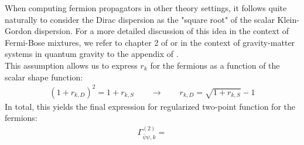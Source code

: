 When computing fermion propagators in other theory settings, it follows quite naturally to consider the Dirac dispersion as the "square root" of the scalar Klein-Gordon dispersion. For a more detailed discussion of this idea in the context of Fermi-Bose mixtures, we refer to chapter 2 of \cite{PawlowskiNPgaugeLecture} or in the context of gravity-matter systems in quantum gravity to the appendix of \cite{BritoHamadaPereiraYamada2019}. \\
This assumption allows us to express $r_k$ for the fermions as a function of the scalar shape function:
\begin{align}
\left(1+r_{k,D}\right)^2 = 1+r_{k,S} \qquad \longrightarrow \qquad r_{k, D} = \sqrt{1+r_{k,S}} - 1
\end{align}
In total, this yields the final expression for regularized two-point function for the fermions:
\begin{align}
	\Gamma^{(2)}_{\bar{\psi}\psi, k} = 
\end{align}
